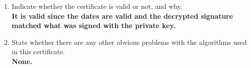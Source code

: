 \documentclass[12pt]{article}
\begin{document}
\begin{enumerate}
\begin{enumerate}
    \item Indicate whether the certificate is valid or not, and why. \\

    \textbf{It is valid since the dates are valid and the decrypted signature matched what was signed with the private key.} \\

    \item State whether there are any other obvious problems with the algorithms used in this certificate. \\

    \textbf{None.} \\

  \end{enumerate}
\end{enumerate}
\end{document}
